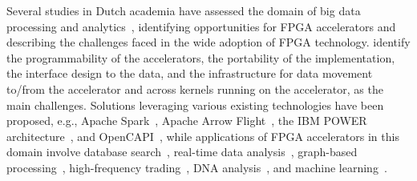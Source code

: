 Several studies in Dutch academia 
 have assessed the domain of big data processing and analytics~\cite{Hoozemans2021FPGAOpportunities, Peltenburg2021GeneratingArrow, Rellermeyer2019TheProcessing, Fang2020In-memorySurvey}, identifying opportunities for FPGA accelerators %
 and describing the challenges faced in the wide adoption of FPGA technology. \citet{Peltenburg2021GeneratingArrow} identify %
 the programmability %
 of the accelerators, %
 the portability %
 of the implementation, %
 the interface design %
 to the data, and %
 the infrastructure %
 for data movement to/from the accelerator and across %
 kernels %
 running on %
 the accelerator, as the main challenges. Solutions %
 leveraging various existing technologies have been proposed, e.g., Apache Spark~\cite{ApacheSpark}, Apache Arrow Flight~\cite{ArrowFlight}, the IBM POWER architecture~\cite{7924241}, and OpenCAPI~\cite{OpenCAPI}, while applications 
of FPGA accelerators in this domain %
involve database search~\cite{Fang2020In-memorySurvey}, real-time data analysis~\cite{Chrysos2019DataNode}, graph-based processing~\cite{Iosup2023GraphContinuum, Prodan2022TowardsEurope}, high-frequency trading~\cite{Chen2021FPGAAlgorithm}, DNA analysis~\cite{Voicu2019SparkJNI:Spark}, and machine learning~\cite{Rellermeyer2019TheProcessing}.



